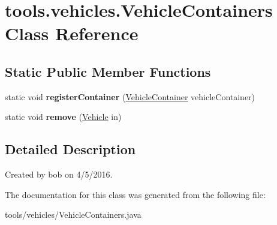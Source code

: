 \hypertarget{classtools_1_1vehicles_1_1_vehicle_containers}{}\section{tools.\+vehicles.\+Vehicle\+Containers Class Reference}
\label{classtools_1_1vehicles_1_1_vehicle_containers}
\subsection*{Static Public Member Functions}
\begin{DoxyCompactItemize}
\item 
static void {\bfseries register\+Container} (\hyperlink{interfacetools_1_1vehicles_1_1_vehicle_container}{Vehicle\+Container} vehicle\+Container)\hypertarget{classtools_1_1vehicles_1_1_vehicle_containers_a48cc54b0f795f0d0e0fb3d2b5c437128}{}\label{classtools_1_1vehicles_1_1_vehicle_containers_a48cc54b0f795f0d0e0fb3d2b5c437128}

\item 
static void {\bfseries remove} (\hyperlink{classtools_1_1vehicles_1_1_vehicle}{Vehicle} in)\hypertarget{classtools_1_1vehicles_1_1_vehicle_containers_a63242bf32d6cdd681a0a05ea2e42bfc6}{}\label{classtools_1_1vehicles_1_1_vehicle_containers_a63242bf32d6cdd681a0a05ea2e42bfc6}

\end{DoxyCompactItemize}


\subsection{Detailed Description}
Created by bob on 4/5/2016. 

The documentation for this class was generated from the following file\+:\begin{DoxyCompactItemize}
\item 
tools/vehicles/Vehicle\+Containers.\+java\end{DoxyCompactItemize}
